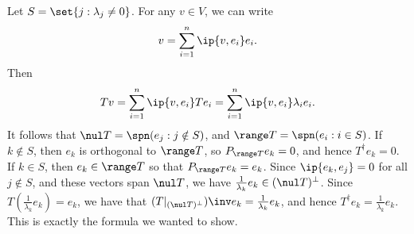 \begin{sol}
    Let $S = \set{j : \lambda_j \neq 0}$.
    For any $v \in V$, we can write
    \[
        v = \sum_{i=1}^n \ip{v, e_i} e_i.
    \]
    Then
    \[
        Tv = \sum_{i=1}^n \ip{v, e_i} Te_i = \sum_{i=1}^n \ip{v, e_i} \lambda_i e_i.
    \]
    It follows that $\nul T = \spn(e_j : j \notin S)$, and $\range T = \spn(e_i : i \in S)$.
    If $k \notin S$, then $e_k$ is orthogonal to $\range T$, so $P_{\range T} e_k = 0$, and hence $T^\dagger e_k = 0$.
    If $k \in S$, then $e_k \in \range T$ so that $P_{\range T} e_k = e_k$.
    Since $\ip{e_k, e_j} = 0$ for all $j \notin S$, and these vectors span $\nul T$, we have $\frac{1}{\lambda_k} e_k \in (\nul T)^\perp$.
    Since $T(\frac{1}{\lambda_k} e_k) = e_k$, we have that $(T|_{(\nul T)^\perp})\inv e_k = \frac{1}{\lambda_k} e_k$, and hence $T^\dagger e_k = \frac{1}{\lambda_k} e_k$.
    This is exactly the formula we wanted to show.
\end{sol}